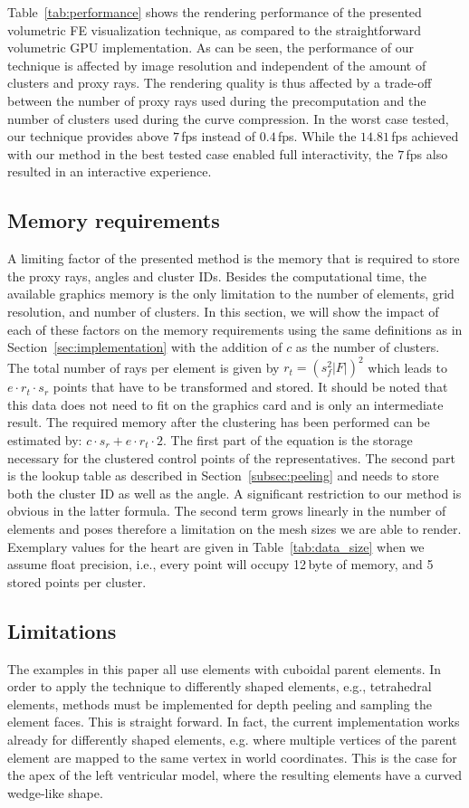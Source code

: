 \documentclass[journal]{vgtc}                %
\begin{document}
Table~\ref{tab:performance} shows the rendering performance of the presented volumetric FE visualization technique, as compared to the straightforward volumetric GPU implementation. As can be seen, the performance of our technique is affected by image resolution and independent of the amount of clusters and proxy rays. The rendering quality is thus affected by a trade-off between the number of proxy rays used during the precomputation and the number of clusters used during the curve compression. In the worst case tested, our technique provides above $7$\,fps instead of $0.4$\,fps. While the $14.81$\,fps achieved with our method in the best tested case enabled full interactivity, the $7$\,fps also resulted in an interactive experience.
%
%
%
\subsection{Memory requirements}\label{subsec:memory}
A limiting factor of the presented method is the memory that is required to store the proxy rays, angles and cluster IDs. Besides the computational time, the available graphics memory is the only limitation to the number of elements, grid resolution, and number of clusters. In this section, we will show the impact of each of these factors on the memory requirements using the same definitions as in Section~\ref{sec:implementation} with the addition of $c$ as the number of clusters. The total number of rays per element is given by $r_t = (s_f^2\left|F\right|)^2$ which leads to $e \cdot r_t \cdot s_r$ points that have to be transformed and stored. It should be noted that this data does not need to fit on the graphics card and is only an intermediate result. The required memory after the clustering has been performed can be estimated by: $c \cdot s_r + e \cdot r_t\cdot 2$. The first part of the equation is the storage necessary for the clustered control points of the representatives. The second part is the lookup table as described in Section~\ref{subsec:peeling} and needs to store both the cluster ID as well as the angle. A significant restriction to our method is obvious in the latter formula. The second term grows linearly in the number of elements and poses therefore a limitation on the mesh sizes we are able to render. Exemplary values for the heart are given in Table~\ref{tab:data_size} when we assume float precision, i.e., every point will occupy 12\,byte of memory, and 5 stored points per cluster.
%
%
%
\subsection{Limitations}\label{subsec:limitations}
The examples in this paper all use elements with cuboidal parent elements. In order to apply the technique to differently shaped elements, e.g., tetrahedral elements, methods must be implemented for depth peeling and sampling the element faces. This is straight forward. In fact, the current implementation works already for differently shaped elements, e.g. where multiple vertices of the parent element are mapped to the same vertex in world coordinates. This is the case for the apex of the left ventricular model, where the resulting elements have a curved wedge-like shape.  
%
%
%
\end{document}
